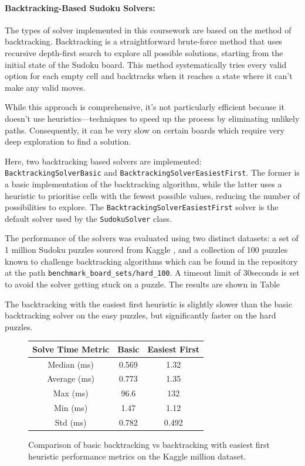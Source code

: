 \documentclass[11pt]{article}
\begin{document}
\paragraph{Backtracking-Based Sudoku Solvers:}

The types of solver implemented in this coursework are based on the method of backtracking. Backtracking is a straightforward brute-force method that uses recursive depth-first search to explore all possible solutions, starting from the initial state of the Sudoku board. This method systematically tries every valid option for each empty cell and backtracks when it reaches a state where it can't make any valid moves.

While this approach is comprehensive, it's not particularly efficient because it doesn't use heuristics—techniques to speed up the process by eliminating unlikely paths. Consequently, it can be very slow on certain boards which require very deep exploration to find a solution. 

Here, two backtracking based solvers are implemented: \texttt{BacktrackingSolverBasic} and \texttt{BacktrackingSolverEasiestFirst}. The former is a basic implementation of the backtracking algorithm, while the latter uses a heuristic to prioritise cells with the fewest possible values, reducing the number of possibilities to explore. The \texttt{BacktrackingSolverEasiestFirst} solver is the default solver used by the \texttt{SudokuSolver} class.

The performance of the solvers was evaluated using two distinct datasets: a set of 1 million Sudoku puzzles sourced from Kaggle \cite{kaggleDataset}, and a collection of 100 puzzles known to challenge backtracking algorithms which can be found in the repository at the path \texttt{benchmark\_board\_sets/hard\_100}. A timeout limit of 30seconds is set to avoid the solver getting stuck on a puzzle. The results are shown in Table 

The backtracking with the easiest first heuristic is slightly slower than the basic backtracking solver on the easy puzzles, but significantly faster on the hard puzzles. 
\begin{figure}[h!]
    \centering
    \begin{tabular}{|c|c|c|}
    \hline
    Solve Time Metric & Basic & Easiest First \\
    \hline
    Median (ms) & 0.569 & 1.32 \\
    \hline
    Average (ms) & 0.773 & 1.35 \\
    \hline
    Max (ms) & 96.6 & 132 \\
    \hline
    Min (ms) & 1.47 & 1.12 \\
    \hline
    Std (ms) & 0.782 & 0.492 \\
    \hline
    \end{tabular}
    \caption{Comparison of basic backtracking vs backtracking with easiest first heuristic performance metrics on the Kaggle million dataset.}
\end{figure}
\end{document}
